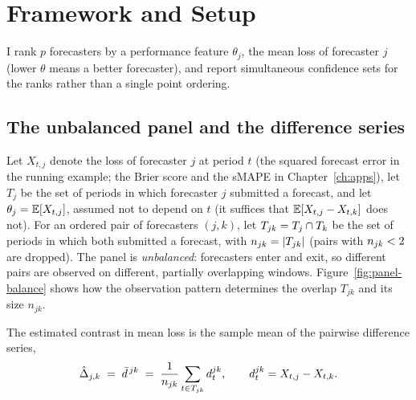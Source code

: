 \chapter{Framework and Setup}
\label{ch:framework}

I rank $p$ forecasters by a performance feature $\theta_j$, the mean loss of
forecaster $j$ (lower $\theta$ means a better forecaster), and report simultaneous
confidence sets for the ranks rather than a single point ordering.

\section{The unbalanced panel and the difference series}
\label{sec:setup}

Let $X_{t,j}$ denote the loss of forecaster $j$ at period $t$ (the squared forecast
error in the running example; the Brier score and the sMAPE in Chapter~\ref{ch:apps}),
let $T_j$ be the set of periods in which forecaster $j$ submitted a forecast, and let
$\theta_j = \mathbb{E}[X_{t,j}]$, assumed not to depend on $t$ (it suffices that
$\mathbb{E}[X_{t,j}-X_{t,k}]$ does not). For an ordered pair of forecasters $(j,k)$, let
$T_{jk} = T_j \cap T_k$ be the set of periods in which both submitted a forecast,
with $n_{jk} = |T_{jk}|$ (pairs with $n_{jk} < 2$ are dropped). The panel is
\emph{unbalanced}: forecasters enter and exit, so different pairs are observed on
different, partially overlapping windows. Figure~\ref{fig:panel-balance} shows how
the observation pattern determines the overlap $T_{jk}$ and its size $n_{jk}$.

\figPanelBalance

The estimated contrast in mean loss is the sample mean of the pairwise difference series,
\begin{equation}
  \hat{\Delta}_{j,k} \;=\; \bar{d}^{\,jk}
  \;=\; \frac{1}{n_{jk}}\sum_{t\in T_{jk}} d^{jk}_t ,
  \qquad d^{jk}_t = X_{t,j}-X_{t,k}.
  \label{eq:contrast}
\end{equation}

